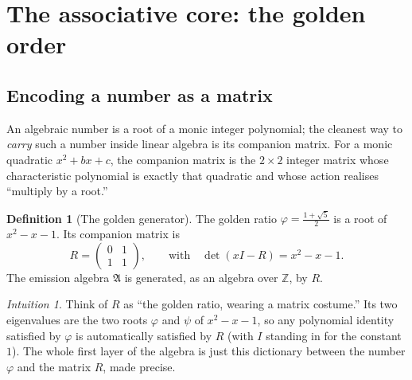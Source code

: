 \documentclass[11pt]{article}
\newcommand{\A}{𝔄}
\theoremstyle{plain}
\theoremstyle{definition}
\newtheorem{definition}[theorem]{Definition}
\theoremstyle{remark}
\newtheorem{intuition}[theorem]{Intuition}
\begin{document}
\section{The associative core: the golden order}\label{sec:core}

\subsection{Encoding a number as a matrix}
An algebraic number is a root of a monic integer polynomial; the cleanest way to \emph{carry} such a number inside linear algebra is its companion matrix. For a monic quadratic $x^{2}+bx+c$, the companion matrix is the $2×2$ integer matrix whose characteristic polynomial is exactly that quadratic and whose action realises ``multiply by a root.''

\begin{definition}[The golden generator]\label{def:R}
The golden ratio $φ=\tfrac{1+\sqrt5}{2}$ is a root of $x^{2}-x-1$. Its companion matrix is
\[
R=\begin{pmatrix}0&1\\1&1\end{pmatrix},\qquad\text{with}\quad \det(xI-R)=x^{2}-x-1 .
\]
The emission algebra $\A$ is generated, as an algebra over $ℤ$, by $R$.
\end{definition}

\begin{intuition}
Think of $R$ as ``the golden ratio, wearing a matrix costume.'' Its two eigenvalues are the two roots $φ$ and $ψ$ of $x^{2}-x-1$, so any polynomial identity satisfied by $φ$ is automatically satisfied by $R$ (with $I$ standing in for the constant $1$). The whole first layer of the algebra is just this dictionary between the number $φ$ and the matrix $R$, made precise.
\end{intuition}
\end{document}
